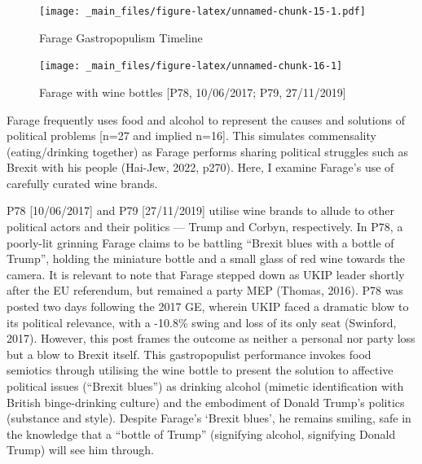 \documentclass[a4paper, nobind]{templates/ociamthesis}
\begin{document}
\begin{figure}
\centering
\texttt{[image: \_main\_files/figure-latex/unnamed-chunk-15-1.pdf]}
\caption{\label{fig:unnamed-chunk-15}Farage Gastropopulism Timeline}
\end{figure}

\begin{figure}
\texttt{[image: \_main\_files/figure-latex/unnamed-chunk-16-1]} \caption{Farage with wine bottles [P78, 10/06/2017; P79, 27/11/2019]}\label{fig:unnamed-chunk-16}
\end{figure}

Farage frequently uses food and alcohol to represent the causes and solutions of political problems {[}n=27 and implied n=16{]}. This simulates commensality (eating/drinking together) as Farage performs sharing political struggles such as Brexit with his people (Hai-Jew, 2022, p270). Here, I examine Farage's use of carefully curated wine brands.

P78 {[}10/06/2017{]} and P79 {[}27/11/2019{]} utilise wine brands to allude to other political actors and their politics --- Trump and Corbyn, respectively. In P78, a poorly-lit grinning Farage claims to be battling ``Brexit blues with a bottle of Trump'', holding the miniature bottle and a small glass of red wine towards the camera. It is relevant to note that Farage stepped down as UKIP leader shortly after the EU referendum, but remained a party MEP (Thomas, 2016). P78 was posted two days following the 2017 GE, wherein UKIP faced a dramatic blow to its political relevance, with a -10.8\% swing and loss of its only seat (Swinford, 2017). However, this post frames the outcome as neither a personal nor party loss but a blow to Brexit itself. This gastropopulist performance invokes food semiotics through utilising the wine bottle to present the solution to affective political issues (``Brexit blues'') as drinking alcohol (mimetic identification with British binge-drinking culture) and the embodiment of Donald Trump's politics (substance and style). Despite Farage's `Brexit blues', he remains smiling, safe in the knowledge that a ``bottle of Trump'' (signifying alcohol, signifying Donald Trump) will see him through.
\end{document}

